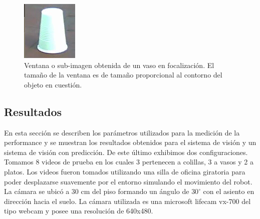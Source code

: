 \begin{figure}[htpb]
\begin{center}
  \includegraphics[scale=0.6]{vision/figures/ventana-2.png}
\end{center}
  \caption[Ejemplo de ventana]{\small Ventana o sub-imagen obtenida de un vaso en 
  focalizaci\'on. El tama\~no de la ventana es de tama\~no proporcional al 
  contorno del objeto en cuesti\'on.}
  \label{fig:ventaneo_2}
\end{figure}

	
	
\subsection{Resultados}
En esta secci\'on se describen los par\'ametros utilizados para la 
medici\'on de la performance y se muestran los resultados obtenidos para 
el sistema de visi\'on y un sistema de visi\'on con predicci\'on. De este 
\'ultimo exhibimos dos configuraciones. Tomamos 8 videos de prueba en los cuales 3 pertenecen a 
colillas, 3 a vasos y 2 a platos. Los videos fueron tomados utilizando 
una silla de oficina giratoria para poder desplazarse suavemente por 
el entorno simulando el movimiento del robot. La c\'amara se ubic\'o a 30 
cm del piso formando un \'angulo de $30^{\circ}$ con el asiento  en direcci\'on 
hacia el suelo. La c\'amara utilizada es una microsoft lifecam vx-700 del tipo webcam y posee una 
resoluci\'on de 640x480.

